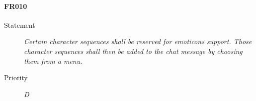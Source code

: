 \paragraph{FR010}
\begin{description}
  \item [Statement] 
  \textit{ Certain character sequences shall be reserved for emoticons support. Those character sequences shall then be
          added to the chat message by choosing them from a menu.}
\item [Priority] \textit{D}
\end{description}

